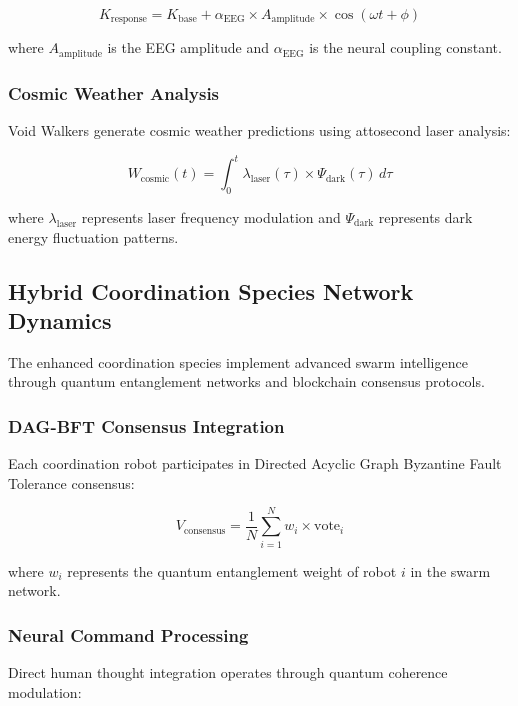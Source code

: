 \documentclass[11pt,a4paper]{article}
\begin{document}
\begin{equation}
K_{\text{response}} = K_{\text{base}} + \alpha_{\text{EEG}} \times A_{\text{amplitude}} \times \cos(\omega t + \phi)
\end{equation}

where $A_{\text{amplitude}}$ is the EEG amplitude and $\alpha_{\text{EEG}}$ is the neural coupling constant.

\subsubsection{Cosmic Weather Analysis}
Void Walkers generate cosmic weather predictions using attosecond laser analysis:

\begin{equation}
W_{\text{cosmic}}(t) = \int_0^{t} \lambda_{\text{laser}}(\tau) \times \Psi_{\text{dark}}(\tau) \, d\tau
\end{equation}

where $\lambda_{\text{laser}}$ represents laser frequency modulation and $\Psi_{\text{dark}}$ represents dark energy fluctuation patterns.

\subsection{Hybrid Coordination Species Network Dynamics}

The enhanced coordination species implement advanced swarm intelligence through quantum entanglement networks and blockchain consensus protocols.

\subsubsection{DAG-BFT Consensus Integration}
Each coordination robot participates in Directed Acyclic Graph Byzantine Fault Tolerance consensus:

\begin{equation}
V_{\text{consensus}} = \frac{1}{N} \sum_{i=1}^{N} w_i \times \text{vote}_i
\end{equation}

where $w_i$ represents the quantum entanglement weight of robot $i$ in the swarm network.

\subsubsection{Neural Command Processing}
Direct human thought integration operates through quantum coherence modulation:
\end{document}
